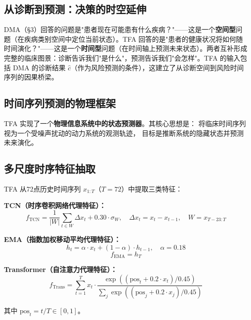 \documentclass[11pt,a4paper]{ctexart}
\theoremstyle{remark}
\begin{document}
\subsection{从诊断到预测：决策的时空延伸}

DMA（§3）回答的问题是"患者现在可能患有什么疾病？"——这是一个\textbf{空间型}问题（在疾病类别空间中定位当前状态）。TFA 回答的是"患者的健康状况将如何随时间演化？"——这是一个\textbf{时间型}问题（在时间轴上预测未来状态）。两者互补形成完整的临床图景：诊断告诉我们"是什么"，预测告诉我们"会怎样"。TFA 的输入包括 DMA 的诊断结果 $\hat{c}$（作为风险预测的条件），这建立了从诊断空间到风险时间序列的因果桥梁。

\subsection{时间序列预测的物理框架}

TFA 实现了一个\textbf{物理信息系统中的状态预测器}。其核心思想是：
将临床时间序列视为一个受噪声扰动的动力系统的观测轨迹，
目标是推断系统的隐藏状态并预测未来演化。

\subsection{多尺度时序特征抽取}

TFA 从72点历史时间序列 $x_{1:T}$（$T=72$）中提取三类特征：

\textbf{TCN（时序卷积网络代理特征）：}
\begin{equation}
f_{\text{TCN}} = \frac{1}{|W|}\sum_{t \in W} \Delta x_t + 0.30 \cdot \sigma_W, \quad \Delta x_t = x_t - x_{t-1}, \quad W = x_{T-23:T}
\end{equation}

\textbf{EMA（指数加权移动平均代理特征）：}
\begin{equation}
h_t = \alpha \cdot x_t + (1 - \alpha) \cdot h_{t-1}, \quad \alpha = 0.18
\end{equation}
\begin{equation}
f_{\text{EMA}} = h_T
\end{equation}

\textbf{Transformer（自注意力代理特征）：}
\begin{equation}
f_{\text{Trans}} = \sum_{t=1}^{T} x_t \cdot \frac{\exp((\text{pos}_t + 0.2 \cdot x_t)/0.45)}{\sum_{j}\exp((\text{pos}_j + 0.2 \cdot x_j)/0.45)}
\end{equation}

其中 $\text{pos}_t = t/T \in [0, 1]$。
\end{document}
